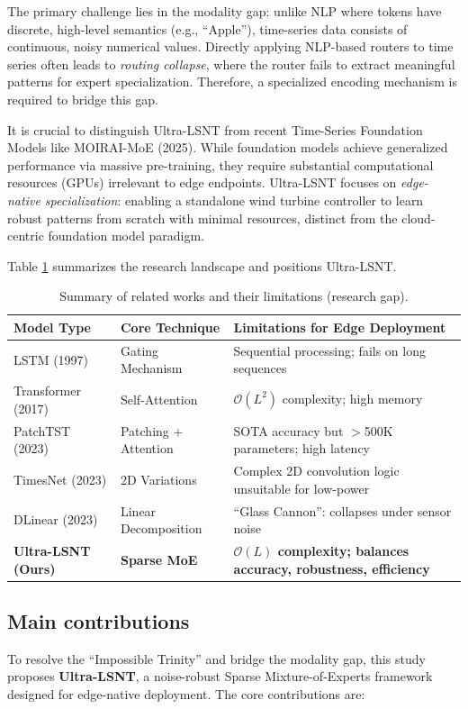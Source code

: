\documentclass[review,3p,times,draft]{elsarticle}
\begin{document}
The primary challenge lies in the modality gap: unlike NLP where tokens have discrete, high-level semantics (e.g., ``Apple''), time-series data consists of continuous, noisy numerical values. Directly applying NLP-based routers to time series often leads to \textit{routing collapse}, where the router fails to extract meaningful patterns for expert specialization. Therefore, a specialized encoding mechanism is required to bridge this gap.

It is crucial to distinguish Ultra-LSNT from recent Time-Series Foundation Models like MOIRAI-MoE (2025). While foundation models achieve generalized performance via massive pre-training, they require substantial computational resources (GPUs) irrelevant to edge endpoints. Ultra-LSNT focuses on \textit{edge-native specialization}: enabling a standalone wind turbine controller to learn robust patterns from scratch with minimal resources, distinct from the cloud-centric foundation model paradigm.

Table \ref{tab:literature} summarizes the research landscape and positions Ultra-LSNT.

\begin{table}[htbp]
\centering
\caption{Summary of related works and their limitations (research gap).}
\label{tab:literature}
\begin{tabular}{@{}lll@{}}
\toprule
\textbf{Model Type} & \textbf{Core Technique} & \textbf{Limitations for Edge Deployment} \\
\midrule
LSTM (1997) & Gating Mechanism & Sequential processing; fails on long sequences \\
Transformer (2017) & Self-Attention & $\mathcal{O}(L^2)$ complexity; high memory \\
PatchTST (2023) & Patching + Attention & SOTA accuracy but $>$500K parameters; high latency \\
TimesNet (2023) & 2D Variations & Complex 2D convolution logic unsuitable for low-power \\
DLinear (2023) & Linear Decomposition & ``Glass Cannon'': collapses under sensor noise \\
\textbf{Ultra-LSNT (Ours)} & \textbf{Sparse MoE} & \textbf{$\mathcal{O}(L)$ complexity; balances accuracy, robustness, efficiency} \\
\bottomrule
\end{tabular}
\end{table}

\subsection{Main contributions}
To resolve the ``Impossible Trinity'' and bridge the modality gap, this study proposes \textbf{Ultra-LSNT}, a noise-robust Sparse Mixture-of-Experts framework designed for edge-native deployment. The core contributions are:
\end{document}
